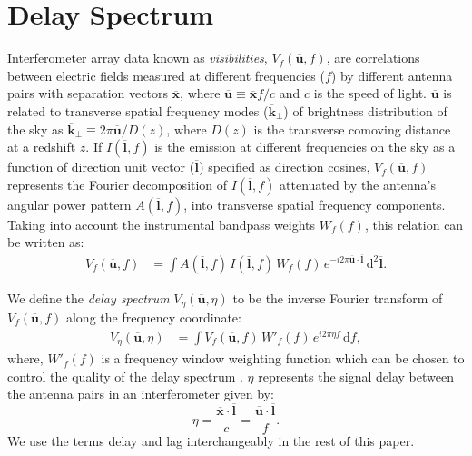 \documentclass[preprint2,iop,numberedappendix]{emulateapj}
\newcommand{\dif}{\mathrm{d}}
\begin{document}
\section{Delay Spectrum}\label{sec:delay-spectrum}

Interferometer array data known as {\it visibilities}, $V_f(\overline{\mathbf{u}},f)$, are correlations between electric fields measured at different frequencies ($f$) by different antenna pairs with separation vectors $\overline{\mathbf{x}}$, where $\overline{\mathbf{u}}\equiv \overline{\mathbf{x}}f/c$ and $c$ is the speed of light. $\overline{\mathbf{u}}$ is related to transverse spatial frequency modes ($\overline{\mathbf{k}}_\perp$) of brightness distribution of the sky as $\overline{\mathbf{k}}_\perp \equiv 2\pi\overline{\mathbf{u}}/D(z)$, where $D(z)$ is the transverse comoving distance at a redshift $z$. If $I(\overline{\mathbf{l}},f)$ is the emission at different frequencies on the sky as a function of direction unit vector ($\overline{\mathbf{l}}$) specified as direction cosines, $V_f(\overline{\mathbf{u}},f)$ represents the Fourier decomposition of $I(\overline{\mathbf{l}},f)$ attenuated by the antenna's angular power pattern $A(\overline{\mathbf{l}},f)$, into transverse spatial frequency components. Taking into account the instrumental bandpass weights $W_f(f)$, this relation can be written as:
\begin{align}\label{eqn:obsvis}
  V_f(\overline{\mathbf{u}},f) &= \int A(\overline{\mathbf{l}},f)\,I(\overline{\mathbf{l}},f)\,W_f(f)\,e^{-i2\pi \overline{\mathbf{u}}\cdot\overline{\mathbf{l}}}\,\dif^2 \overline{\mathbf{l}}.
\end{align}

We define the {\it delay spectrum} $V_\eta(\overline{\mathbf{u}},\eta)$ to be the inverse Fourier transform of $V_f(\overline{\mathbf{u}},f)$ along the frequency coordinate:
\begin{align}\label{eqn:delay-transform}
  V_\eta(\overline{\mathbf{u}},\eta) &= \int V_f(\overline{\mathbf{u}},f)\,W'_f(f)\,e^{i2\pi\eta f}\,\dif f,
\end{align}
where, $W'_f(f)$ is a frequency window weighting function which can be chosen to control the quality of the delay spectrum \citep{thy13,ved12}. $\eta$ represents the signal delay between the antenna pairs in an interferometer given by:
\begin{equation}\label{eqn:delay}
  \eta = \frac{\overline{\mathbf{x}}\cdot\overline{\mathbf{l}}}{c} = \frac{\overline{\mathbf{u}}\cdot\overline{\mathbf{l}}}{f}.
\end{equation}
We use the terms delay and lag interchangeably in the rest of this paper.
\end{document}
